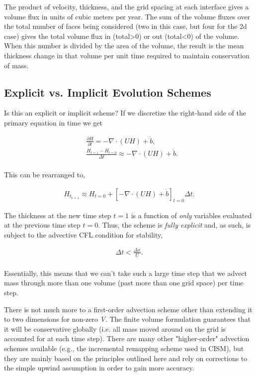 The product of velocity, thickness, and the grid spacing at each interface gives a volume flux in units of cubic meters per year. The sum of the volume fluxes over the total number of faces being considered (two in this case, but four for the 2d case) gives the total volume flux in (total>0) or out (total<0) of the volume. When this number is divided by the area of the volume, the result is the mean thickness change in that volume per unit time required to maintain conservation of mass.

\subsection{Explicit vs. Implicit Evolution Schemes}
Is this an explicit or implicit scheme? If we discretize the right-hand side of the primary equation in time we get

\begin{align*}
  & \frac{\partial H}{\partial t}=-\nabla \cdot \left( UH \right)+\dot{b}, \\
 & \frac{H_{t=1}-H_{t=0}}{\Delta t}\approx -\nabla \cdot \left( UH \right)+\dot{b}.\\
\end{align*}

This can be rearranged to,

\begin{align*}
H_{t_{t=1}}\approx H_{t=0}+\left[ -\nabla \cdot \left( UH \right)+\dot{b} \right]_{t=0}\Delta t.
\end{align*}

The thickness at the new time step $t=1$ is a function of \textit{only} variables evaluated at the previous time step $t=0$. Thus, the scheme is \textit{fully explicit} and, as such, is subject to the advective CFL condition for stability,

\begin{align*}
\Delta t<\frac{\Delta x}{U}.\\
\end{align*}

Essentially, this means that we can't take such a large time step that we advect mass through more than one volume (past more than one grid space) per time step.

There is not much more to a first-order advection scheme other than extending it to two dimensions for non-zero \textit{V}. The finite volume formulation guarantees that it will be conservative globally (i.e. all mass moved around on the grid is accounted for at each time step). There are many other "higher-order" advection schemes available (e.g., the incremental remapping scheme used in CISM), but they are mainly based on the principles outlined here and rely on corrections to the simple upwind assumption in order to gain more accuracy.

